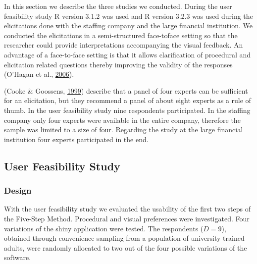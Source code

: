 \documentclass[openright,titlepage,12pt,a4paper]{book}
\begin{document}
In this section we describe the three studies we conducted. During the user feasibility study R version 3.1.2 was used and R version 3.2.3 was used during the elicitations done with the staffing company and the large financial institution. We conducted the elicitations in a semi-structured face-toface setting so that the researcher could provide interpretations accompanying the visual feedback. An advantage of a face-to-face setting is that it allows clarification of procedural and elicitation related questions thereby improving the validity of the responses (O'Hagan et al., \protect\hyperlink{ref-ohagan_uncertain_2006}{2006}).

(Cooke \& Goossens, \protect\hyperlink{ref-cooke_procedures_1999}{1999}) describe that a panel of four experts can be sufficient for an elicitation, but they recommend a panel of about eight experts as a rule of thumb. In the user feasibility study nine respondents participated. In the staffing company only four experts were available in the entire company, therefore the sample was limited to a size of four. Regarding the study at the large financial institution four experts participated in the end.

\hypertarget{user-feasibility-study}{%
\subsection{User Feasibility Study}\label{user-feasibility-study}}

\hypertarget{design}{%
\subsubsection{Design}\label{design}}

With the user feasibility study we evaluated the usability of the first two steps of the Five-Step Method. Procedural and visual preferences were investigated. Four variations of the shiny application were tested. The respondents (\(D=9\)), obtained through convenience sampling from a population of university trained adults, were randomly allocated to two out of the four possible variations of the software.
\end{document}
